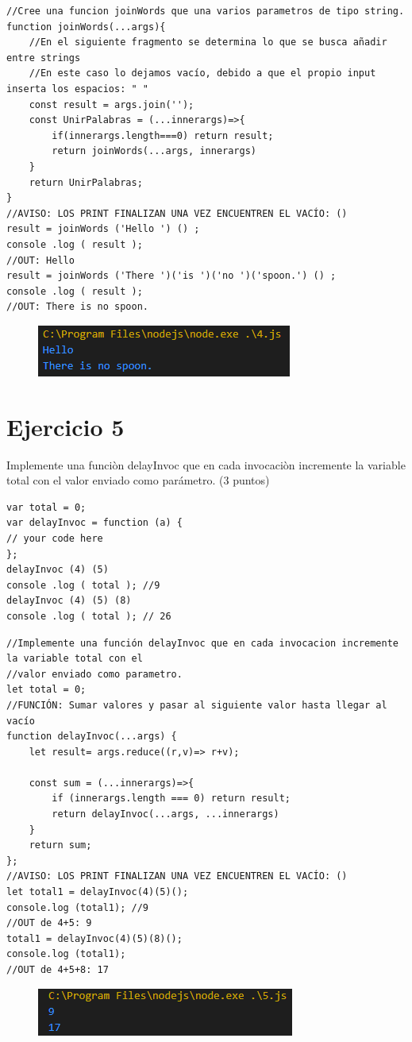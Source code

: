 \documentclass{article}
\begin{document}
\begin{verbatim}
//Cree una funcion joinWords que una varios parametros de tipo string.
function joinWords(...args){
    //En el siguiente fragmento se determina lo que se busca añadir entre strings 
    //En este caso lo dejamos vacío, debido a que el propio input inserta los espacios: " "
    const result = args.join('');
    const UnirPalabras = (...innerargs)=>{
        if(innerargs.length===0) return result;
        return joinWords(...args, innerargs)
    }
    return UnirPalabras;
}
//AVISO: LOS PRINT FINALIZAN UNA VEZ ENCUENTREN EL VACÍO: ()
result = joinWords ('Hello ') () ;
console .log ( result ); 
//OUT: Hello
result = joinWords ('There ')('is ')('no ')('spoon.') () ;
console .log ( result );
//OUT: There is no spoon.
\end{verbatim}
\begin{figure}[h]
\centering
\includegraphics[scale=1.5]{EJERCICIO4.png}
\end{figure}



\newpage
\section{Ejercicio 5}
Implemente una funciòn delayInvoc que en cada invocaciòn incremente la variable total con el valor enviado como parámetro. (3 puntos)

\begin{verbatim}
var total = 0;
var delayInvoc = function (a) {
// your code here
};
delayInvoc (4) (5)
console .log ( total ); //9
delayInvoc (4) (5) (8)
console .log ( total ); // 26
\end{verbatim}

\begin{verbatim}
//Implemente una función delayInvoc que en cada invocacion incremente la variable total con el
//valor enviado como parametro.
let total = 0;
//FUNCIÓN: Sumar valores y pasar al siguiente valor hasta llegar al vacío
function delayInvoc(...args) {
    let result= args.reduce((r,v)=> r+v);

    const sum = (...innerargs)=>{
        if (innerargs.length === 0) return result;
        return delayInvoc(...args, ...innerargs)
    }
    return sum;
};
//AVISO: LOS PRINT FINALIZAN UNA VEZ ENCUENTREN EL VACÍO: ()
let total1 = delayInvoc(4)(5)();
console.log (total1); //9
//OUT de 4+5: 9
total1 = delayInvoc(4)(5)(8)();
console.log (total1);
//OUT de 4+5+8: 17
\end{verbatim}
\begin{figure}[h]
\centering
\includegraphics[scale=1.5]{EJERCICIO5.png}
\end{figure}
\end{document}
